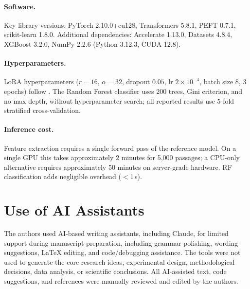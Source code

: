 \paragraph{Software.}
Key library versions: PyTorch 2.10.0+cu128, Transformers 5.8.1, PEFT 0.7.1, scikit-learn 1.8.0.
Additional dependencies: Accelerate 1.13.0, Datasets 4.8.4, XGBoost 3.2.0, NumPy 2.2.6 (Python 3.12.3, CUDA 12.8).

\paragraph{Hyperparameters.}
LoRA hyperparameters ($r{=}16$, $\alpha{=}32$, dropout $0.05$, lr $2{\times}10^{-4}$, batch size 8, 3 epochs) follow \citet{hu2022lora}.
The Random Forest classifier uses 200 trees, Gini criterion, and no max depth, without hyperparameter search; all reported results use 5-fold stratified cross-validation.

\paragraph{Inference cost.}
Feature extraction requires a single forward pass of the reference model.
On a single GPU this takes approximately 2 minutes for 5{,}000 passages; a CPU-only alternative requires approximately 50 minutes on server-grade hardware.
RF classification adds negligible overhead ($<$1\,s).

\section{Use of AI Assistants}
\label{app:ai_assistants}

The authors used AI-based writing assistants, including Claude, for limited support during manuscript preparation, including grammar polishing, wording suggestions, LaTeX editing, and code/debugging assistance. The tools were not used to generate the core research ideas, experimental design, methodological decisions, data analysis, or scientific conclusions. All AI-assisted text, code suggestions, and references were manually reviewed and edited by the authors.
